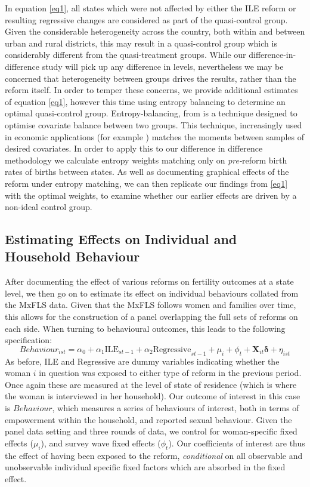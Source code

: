 \documentclass[a4paper,11pt]{article}
\begin{document}
\begin{spacing}{1.5}
In equation \ref{eq1}, all states which were not affected by either the ILE reform or resulting regressive changes are considered as part of the quasi-control group.  Given the considerable heterogeneity across the country, both within and between urban and rural districts, this may result in a quasi-control group which is considerably different from the quasi-treatment groups.  While our difference-in-difference study will pick up any difference in levels, nevertheless we may be concerned that heterogeneity between groups drives the results, rather than the reform itself.  In order to temper these concerns, we provide additional estimates of equation \ref{eq1}, however this time using entropy balancing to determine an optimal quasi-control group. Entropy-balancing, from \citet{Hainmueller2012} is a technique designed to optimise covariate balance between two groups.  This technique, increasingly used in economic applications (for example \citet{StantonThomas2016}) matches the moments between samples of desired covariates.  In order to apply this to our difference in difference methodology we calculate entropy weights matching only on \emph{pre-}reform birth rates of births between states.  As well as documenting graphical effects of the reform under entropy matching, we can then replicate our findings from \ref{eq1} with the optimal weights, to examine whether our earlier effects are driven by a non-ideal control group.


\subsection{Estimating Effects on Individual and Household Behaviour}
After documenting the effect of various reforms on fertility outcomes at a state level, we then go on to estimate its effect on individual behaviours collated from the MxFLS data.  Given that the MxFLS follows women and families over time, this allows for the construction of a panel overlapping the full sets of reforms on each side.  When turning to behavioural outcomes, this leads to the following specification:
\begin{equation}
  \label{eq:behav}
  Behaviour_{ist} = \alpha_0 + \alpha_1 \text{ILE}_{st-1}+\alpha_2 \text{Regressive}_{st-1} + \mu_i + \phi_t + \bm{X}_{it}\bm{\delta} + \eta_{ist}
\end{equation}
As before, ILE and Regressive are dummy variables indicating whether the woman $i$ in question was exposed to either type of reform in the previous period.  Once again these are measured at the level of state of residence (which is where the woman is interviewed in her household).  Our outcome of interest in this case is $Behaviour$, which measures a series of behaviours of interest, both in terms of empowerment within the household, and reported sexual behaviour.  Given the panel data setting and three rounds of data, we control for woman-specific fixed effects ($\mu_i$), and survey wave fixed effects ($\phi_t$).  Our coefficients of interest are thus the effect of having been exposed to the reform, \emph{conditional} on all observable and unobservable individual specific fixed factors which are absorbed in the fixed effect.


\end{spacing}
\end{document}
